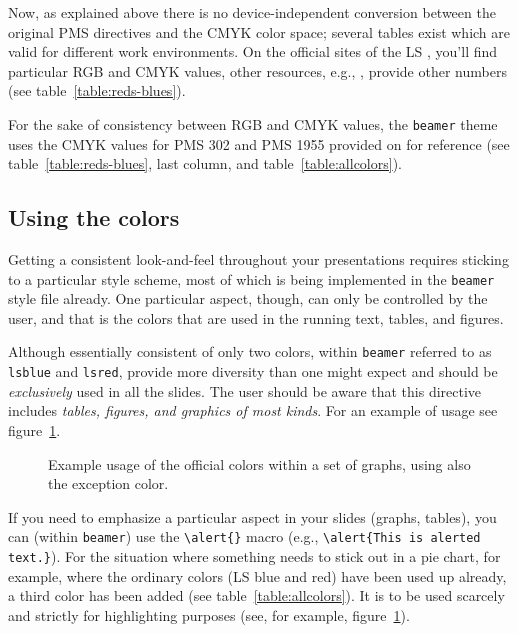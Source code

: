 Now, as explained above there is no device-independent conversion between the
original PMS directives and the CMYK color space; several tables exist which
are valid for different work environments. On the official sites of the LS
\cite{KAN::}, you'll find particular RGB and CMYK values, other resources,
e.g., \cite{::TDC}, provide other numbers (see table~\ref{table:reds-blues}).

For the sake of consistency between RGB and CMYK values, the \texttt{beamer}
theme uses the CMYK values for PMS 302 and PMS 1955 provided on \cite{::TDC}
for reference (see table~\ref{table:reds-blues}, last column, and
table~\ref{table:allcolors}).


\subsection{Using the colors}\label{subsection:usingthecolors}

Getting a consistent look-and-feel throughout your presentations requires
sticking to a particular style scheme, most of which is being implemented in
the \texttt{beamer} style file already. One particular aspect, though, can only
be controlled by the user, and that is the colors that are used in the running
text, tables, and figures.

Although essentially consistent of only two colors, within \texttt{beamer}
referred to as \lstinline!lsblue! and \lstinline!lsred!, provide more diversity
than one might expect and should be  \emph{exclusively} used  in all the
slides. The user should be aware that this directive includes \emph{tables,
figures, and graphics of most kinds}. For an example of usage see
figure~\ref{fig:coloredgraphs}.

\begin{figure}
\setlength{\figurewidth}{10cm}
\setlength{\figureheight}{5cm}
\centering

\caption{Example usage of the official colors within a set of graphs, using
also the exception color.}
\label{fig:coloredgraphs}
\end{figure}

If you need to emphasize a particular aspect in your slides (graphs, tables),
you can (within \texttt{beamer}) use the \lstinline!\alert{}! macro (e.g.,
\lstinline!\alert{This is alerted text.}!). For the situation where something
needs to stick out in a pie chart, for example, where the ordinary colors (LS
blue and red) have been used up already, a third color has been added (see
table~\ref{table:allcolors}). It is to be used scarcely and strictly for
highlighting purposes (see, for example, figure~\ref{fig:coloredgraphs}).


